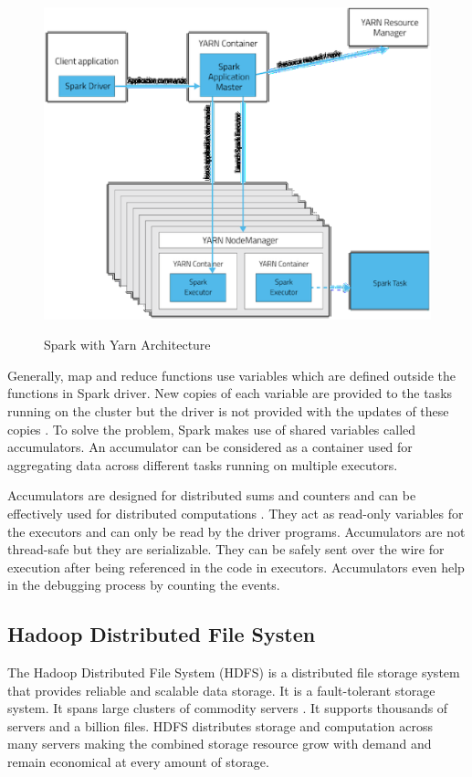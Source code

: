 \documentclass[9pt,twocolumn,twoside]{../../styles/osajnl}
\begin{document}
\begin{figure}[ht]
  \includegraphics[scale=0.35]{images/sparkYarn.eps}
  \caption{Spark with Yarn Architecture} \cite{sparkwithYarn}
\end{figure}

Generally, map and reduce functions use variables which are defined
outside the functions in Spark driver. New copies of each variable are
provided to the tasks running on the cluster but the driver is not
provided with the updates of these copies \cite{accumulatorSpark}. To
solve the problem, Spark makes use of shared variables called
accumulators. An accumulator can be considered as a container used for
aggregating data across different tasks running on multiple executors.

Accumulators are designed for distributed sums and counters and can be
effectively used for distributed computations
\cite{accumulatorGit}. They act as read-only variables for the
executors and can only be read by the driver programs. Accumulators
are not thread-safe but they are serializable. They can be safely sent
over the wire for execution after being referenced in the code in
executors. Accumulators even help in the debugging process by counting
the events.


\subsection{Hadoop Distributed File Systen}

The Hadoop Distributed File System (HDFS) is a distributed file
storage system that provides reliable and scalable data storage. It is
a fault-tolerant storage system. It spans large clusters of commodity
servers \cite{hdfsHorton}. It supports thousands of servers and a
billion files. HDFS distributes storage and computation across many
servers making the combined storage resource grow with demand and
remain economical at every amount of storage.
\end{document}
